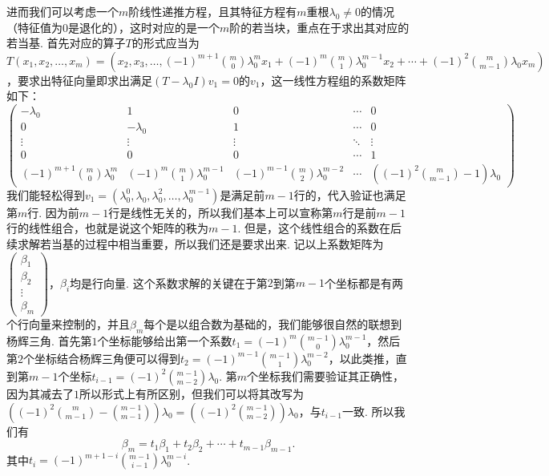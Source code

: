 进而我们可以考虑一个$m$阶线性递推方程，且其特征方程有$m$重根$\lambda_0 \neq 0$的情况（特征值为$0$是退化的），这时对应的是一个$m$阶的若当块，重点在于求出其对应的若当基. 首先对应的算子$T$的形式应当为$T(x_1, x_2, \ldots, x_m) = (x_2, x_3, \ldots, (-1)^{m + 1} \binom{m}{0} \lambda_0^m x_1 + (-1)^m \binom{m}{1} \lambda_0^{m - 1} x_2 + \cdots + (-1)^2 \binom{m}{m - 1} \lambda_0 x_{m})$，要求出特征向量即求出满足$(T - \lambda_0 I)v_1 = 0$的$v_1$，这一线性方程组的系数矩阵如下：
\[
    \begin{pmatrix}
        -\lambda_0                            & 1                                     & 0                                           & \cdots & 0                                       \\
        0                                     & -\lambda_0                            & 1                                           & \cdots & 0                                       \\
        \vdots                                & \vdots                                & \vdots                                      & \ddots & \vdots                                  \\
        0                                     & 0                                     & 0                                           & \cdots & 1                                       \\
        (-1)^{m + 1} \binom{m}{0} \lambda_0^m & (-1)^m \binom{m}{1} \lambda_0^{m - 1} & (-1)^{m - 1} \binom{m}{2} \lambda_0^{m - 2} & \cdots & ((-1)^2 \binom{m}{m - 1} - 1) \lambda_0
    \end{pmatrix}
\]
我们能轻松得到$v_1 = (\lambda_0^0, \lambda_0, \lambda_0^2, \ldots, \lambda_0^{m - 1})$是满足前$m-1$行的，代入验证也满足第$m$行. 因为前$m-1$行是线性无关的，所以我们基本上可以宣称第$m$行是前$m-1$行的线性组合，也就是说这个矩阵的秩为$m-1$. 但是，这个线性组合的系数在后续求解若当基的过程中相当重要，所以我们还是要求出来. 记以上系数矩阵为$\begin{pmatrix}
        \beta_1 \\ \beta_2 \\ \vdots \\ \beta_m
    \end{pmatrix}$，$\beta_i$均是行向量. 这个系数求解的关键在于第$2$到第$m-1$个坐标都是有两个行向量来控制的，并且$\beta_m$每个是以组合数为基础的，我们能够很自然的联想到杨辉三角. 首先第$1$个坐标能够给出第一个系数$t_1 = (-1)^m \binom{m - 1}{0} \lambda_0^{m - 1}$，然后第$2$个坐标结合杨辉三角便可以得到$t_2 = (-1)^{m - 1} \binom{m - 1}{1} \lambda_0^{m - 2}$，以此类推，直到第$m-1$个坐标$t_{i - 1} = (-1)^2 \binom{m-1}{m-2} \lambda_0$. 第$m$个坐标我们需要验证其正确性，因为其减去了$1$所以形式上有所区别，但我们可以将其改写为$((-1)^2 \binom{m}{m - 1} - \binom{m - 1}{m - 1}) \lambda_0 = ((-1)^2 \binom{m - 1}{m - 2}) \lambda_0$，与$t_{i-1}$一致. 所以我们有 \[
    \beta_m = t_1 \beta_1 + t_2 \beta_2 + \cdots + t_{m - 1} \beta_{m - 1}.
\]
其中$t_i = (-1)^{m + 1 - i} \binom{m - 1}{i - 1} \lambda_0^{m - i}$.

